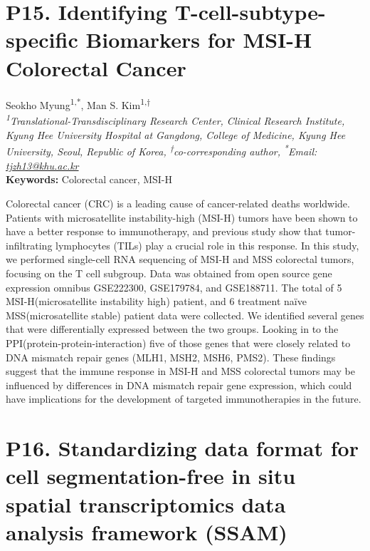 
\section*{P15. Identifying T-cell-subtype-specific Biomarkers for MSI-H Colorectal Cancer}

\begin{center}
Seokho Myung\textsuperscript{1,*}, Man S. Kim\textsuperscript{1,†} \\
\vspace{0.2cm}
\textit{\textsuperscript{1}Translational-Transdisciplinary Research Center, Clinical Research Institute, Kyung Hee University Hospital at Gangdong, College of Medicine, Kyung Hee University, Seoul, Republic of Korea, \textsuperscript{†}co-corresponding author, \textsuperscript{*}Email: \href{mailto:tjzh13@khu.ac.kr}{tjzh13@khu.ac.kr}} \\
\vspace{0.2cm}
\textbf{Keywords:} Colorectal cancer, MSI-H
\end{center}

\noindent
Colorectal cancer (CRC) is a leading cause of cancer-related deaths worldwide. Patients with microsatellite instability-high (MSI-H) tumors have been shown to have a better response to immunotherapy, and previous study show that tumor-infiltrating lymphocytes (TILs) play a crucial role in this response. In this study, we performed single-cell RNA sequencing of MSI-H and MSS colorectal tumors, focusing on the T cell subgroup. Data was obtained from open source gene expression omnibus GSE222300, GSE179784, and GSE188711. The total of 5 MSI-H(microsatellite instability high) patient, and 6 treatment naïve MSS(microsatellite stable) patient data were collected. We identified several genes that were differentially expressed between the two groups. Looking in to the PPI(protein-protein-interaction) five of those genes that were closely related to DNA mismatch repair genes (MLH1, MSH2, MSH6, PMS2). These findings suggest that the immune response in MSI-H and MSS colorectal tumors may be influenced by differences in DNA mismatch repair gene expression, which could have implications for the development of targeted immunotherapies in the future.
\newpage


\section*{P16. Standardizing data format for cell segmentation-free in situ spatial transcriptomics data analysis framework (SSAM)}

